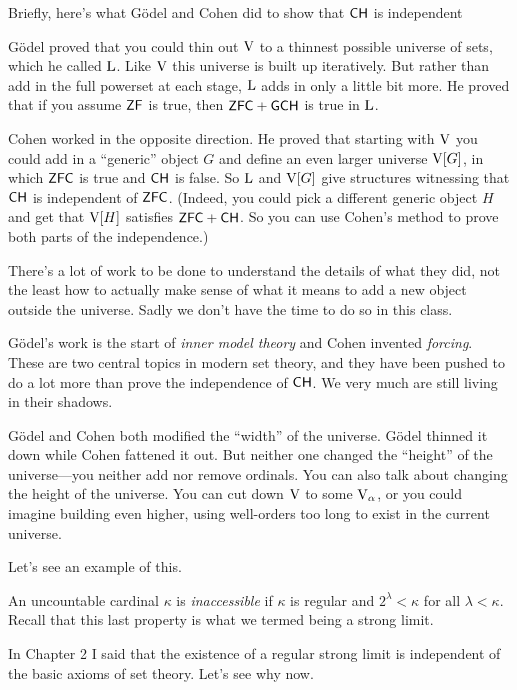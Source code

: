 \documentclass[10pt]{amsart}
\begin{document}
Briefly, here's what G\"odel and Cohen did to show that $\mathsf{CH}$ is independent

G\"odel proved that you could thin out $\mathrm{V}$ to a thinnest possible universe of sets, which he called $\mathrm{L}$. Like $\mathrm{V}$ this universe is built up iteratively. But rather than add in the full powerset at each stage, $\mathrm{L}$ adds in only a little bit more. He proved that if you assume $\mathsf{ZF}$ is true, then $\mathsf{ZFC} + \mathsf{GCH}$ is true in $\mathrm{L}$.

Cohen worked in the opposite direction. He proved that starting with $\mathrm{V}$ you could add in a ``generic'' object $G$ and define an even larger universe $\mathrm{V}[G]$, in which $\mathsf{ZFC}$ is true and $\mathsf{CH}$ is false. So $\mathrm{L}$ and $\mathrm{V}[G]$ give structures witnessing that $\mathsf{CH}$ is independent of $\mathsf{ZFC}$. (Indeed, you could pick a different generic object $H$ and get that $\mathrm{V}[H]$ satisfies $\mathsf{ZFC} + \mathsf{CH}$. So you can use Cohen's method to prove both parts of the independence.)

There's a lot of work to be done to understand the details of what they did, not the least how to actually make sense of what it means to add a new object outside the universe. Sadly we don't have the time to do so in this class.

G\"odel's work is the start of \emph{inner model theory} and Cohen invented \emph{forcing}. These are two central topics in modern set theory, and they have been pushed to do a lot more than prove the independence of $\mathsf{CH}$. We very much are still living in their shadows. 
\smallskip

G\"odel and Cohen both modified the ``width'' of the universe. G\"odel thinned it down while Cohen fattened it out. But neither one changed the ``height'' of the universe---you neither add nor remove ordinals. You can also talk about changing the height of the universe. You can cut down $\mathrm{V}$ to some $\mathrm{V}_\alpha$, or you could imagine building even higher, using well-orders too long to exist in the current universe. 

Let's see an example of this.

\begin{definition}
An uncountable cardinal $\kappa$ is \emph{inaccessible} if $\kappa$ is regular and $2^\lambda < \kappa$ for all $\lambda < \kappa$. Recall that this last property is what we termed being a strong limit.
\end{definition}

In Chapter 2 I said that the existence of a regular strong limit is independent of the basic axioms of set theory. Let's see why now.
\end{document}
